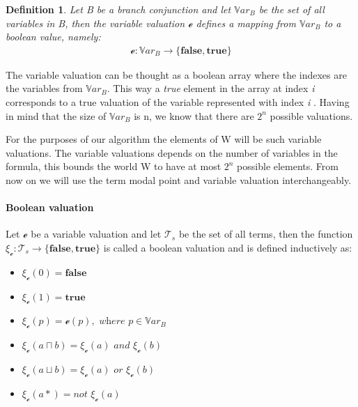 \documentclass{article}
\newtheorem{defn}{Definition}[section]
\newcommand{\curvedE}{\mathscr{e}}
\newcommand{\Var}{\mathbb{V}ar}
\newcommand{\vBool}{\xi}
\newcommand{\Ts}{\mathcal{T}_s}
\begin{document}
	\begin{defn}\label{variable-valuation}
		Let B be a branch conjunction and let $\Var_B$ be the set of all variables in B, then the variable valuation $\curvedE$ defines a mapping from $\Var_B$ to a boolean value, namely:
		\begin{align*}
			\curvedE : \Var_B \rightarrow \{ \textbf{false}, \textbf{true}\}
		\end{align*}
	\end{defn}
	The variable valuation can be thought as a boolean array where the indexes are the variables from $\Var_B$. This way a \emph{true} element in the array at index \emph{i} corresponds to a true valuation of the variable represented with index \emph{i} . Having in mind that the size of $\Var_B$ is n, we know that there are $2^n$ possible valuations. 

For the purposes of our algorithm the elements of W will be such variable valuations. The variable valuations depends on the number of variables in the formula, this bounds the world W to have at most $2^n$ possible elements. From now on we will use the term modal point and variable valuation interchangeably.

	\paragraph{Boolean valuation}
		Let $\curvedE$ be a variable valuation and let $\Ts$ be the set of all terms,
		then the function $\vBool_{\curvedE} : \Ts \rightarrow \{ \textbf{false}, \textbf{true}\}$ is called a boolean valuation and is defined inductively as:
		\begin{itemize}
			\item $\vBool_{\curvedE}(0) = \textbf{false}$
			\item $\vBool_{\curvedE}(1) = \textbf{true}$
			\item $\vBool_{\curvedE}(p) = \curvedE(p), \textit{ where } p \in \Var_B$
			\item $\vBool_{\curvedE}(a \sqcap b) = \vBool_{\curvedE}(a) \textit{ and } \vBool_{\curvedE}(b)$
			\item $\vBool_{\curvedE}(a \sqcup b) = \vBool_{\curvedE}(a) \textit{ or } \vBool_{\curvedE}(b)$
			\item $\vBool_{\curvedE}(a*) = \textit{not } \vBool_{\curvedE}(a)$
		\end{itemize}
	
\end{document}
